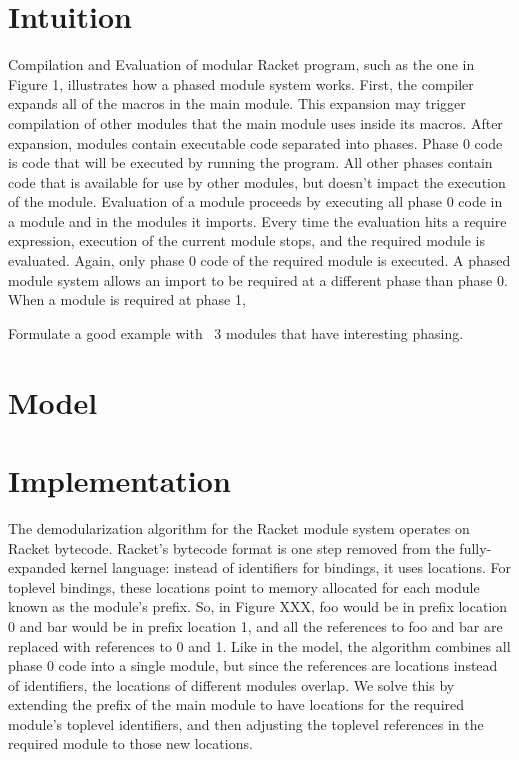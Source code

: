 \documentclass{llncs}
\begin{document}
\section{Intuition}

Compilation and Evaluation of modular Racket program, such as the one in Figure 1, illustrates how a phased module system works. 
First, the compiler expands all of the macros in the main module. 
This expansion may trigger compilation of other modules that the main module uses inside its macros.
After expansion, modules contain executable code separated into phases.
Phase 0 code is code that will be executed by running the program.
All other phases contain code that is available for use by other modules, but doesn't impact the execution of the module.
Evaluation of a module proceeds by executing all phase 0 code in a module and in the modules it imports.
Every time the evaluation hits a require expression, execution of the current module stops, and the required module is evaluated.
Again, only phase 0 code of the required module is executed.
A phased module system allows an import to be required at a different phase than phase 0.
When a module is required at phase 1, 

Formulate a good example with ~3 modules that have interesting phasing.

\section{Model}

\section{Implementation}

The demodularization algorithm for the Racket module system operates on Racket bytecode. 
Racket's bytecode format is one step removed from the fully-expanded kernel language: instead of identifiers for bindings, it uses locations.
For toplevel bindings, these locations point to memory allocated for each module known as the module's prefix.
So, in Figure XXX, foo would be in prefix location 0 and bar would be in prefix location 1, and all the references to foo and bar are replaced with references to 0 and 1.
Like in the model, the algorithm combines all phase 0 code into a single module, but since the references are locations instead of identifiers, the locations of different modules overlap.
We solve this by extending the prefix of the main module to have locations for the required module's toplevel identifiers, and then adjusting the toplevel references in the required module to those new locations. 
\end{document}
